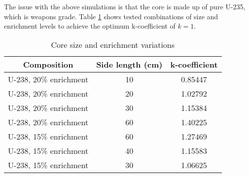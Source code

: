 The issue with the above simulations is that the core is made up of pure U-235, which is weapons grade. Table \ref{tab:variations} shows tested combinations of size and enrichment levels to achieve the optimum k-coefficient of $k=1$.
\begin{table}[!htbp]
\centering
\caption{Core size and enrichment variations}
\label{tab:variations}
\begin{tabular}{|c|c|c|}
\hline
Composition            & Side length (cm) & k-coefficient \\
\hline
U-238, 20\% enrichment & 10               & 0.85447       \\
\hline
U-238, 20\% enrichment & 20               & 1.02792       \\
\hline
U-238, 20\% enrichment & 30               & 1.15384       \\
\hline
U-238, 20\% enrichment & 60               & 1.40225       \\
\hline
U-238, 15\% enrichment & 60               & 1.27469       \\
\hline
U-238, 15\% enrichment & 40               & 1.15583       \\
\hline
U-238, 15\% enrichment & 30               & 1.06625      \\
\hline
\end{tabular}
\end{table}